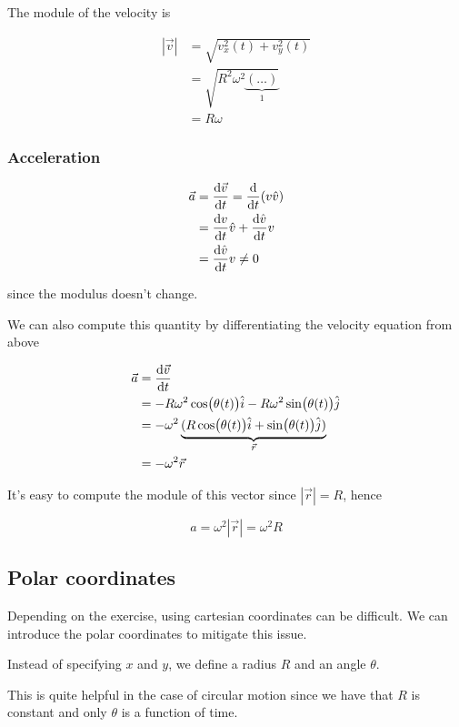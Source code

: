\documentclass[14pt]{extarticle}
\begin{document}
The module of the velocity is

\begin{align*}
  |\vec v| & = \sqrt{v_x^2(t) + v_y^2(t)}                 \\
           & = \sqrt{R^2 \omega^2 \underbrace{(\dots)}_1} \\
           & = R\omega
\end{align*}

\subsubsection{Acceleration}

\begin{align*}
  \vec a & = \dv {\vec v}{t} = \dv {t} (v \hat v) \\
         & = \dv {v}{t}\hat v + \dv{\hat v}{t} v  \\
         & = \dv {\hat v}{t} v \ne 0
\end{align*}

since the modulus doesn't change.

We can also compute this quantity by differentiating the velocity equation from above

\begin{align*}
  \vec a & = \dv{\vec v}{t}                                                                          \\
         & = - R \omega ^2 \cos (\theta(t)) \hat i - R \omega^2 \sin (\theta(t)) \hat j              \\
         & = - \omega^2 \underbrace{(R \cos (\theta(t)) \hat i +  \sin (\theta(t)) \hat j)}_{\vec r} \\
         & = -\omega^2 \vec r
\end{align*}

It's easy to compute the module of this vector since $|\vec r| = R$, hence

$$
  a = \omega^2  |\vec r| = \omega^2 R
$$

\subsection{Polar coordinates}

Depending on the exercise, using cartesian coordinates can be difficult.
We can introduce the polar coordinates to mitigate this issue.

Instead of specifying $x$ and $y$, we define a radius $R$ and an angle $\theta$.

This is quite helpful in the case of circular motion since we have that $R$ is constant
and only $\theta$ is a function of time.
\end{document}
